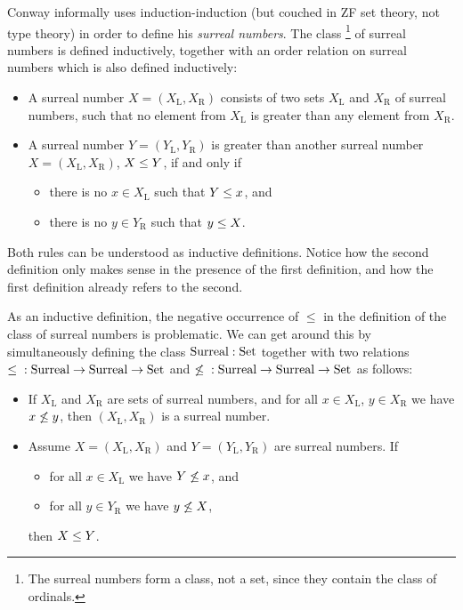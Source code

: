\documentclass{article}
\begin{document}
\begin{example}
\label{ex:surreal}

Conway \cite{conway2001ONAG} informally uses induction-induction (but
couched in ZF set theory, not type theory) in order to define his
\emph{surreal numbers}. The class \footnote{The surreal numbers form a
  class, not a set, since they contain the class of
  ordinals.} of surreal numbers is
defined inductively, together with an order relation on surreal
numbers which is also defined inductively:

\begin{itemize}
\item A surreal number $X = (X_\mathrm{L}, X_\mathrm{R})$ consists of
  two sets $X_\mathrm{L}$ and $X_\mathrm{R}$ of surreal numbers, such
  that no element from $X_\mathrm{L}$ is greater than any element from
  $X_\mathrm{R}$.
\item A surreal number $Y = (Y_\mathrm{L}, Y_\mathrm{R})$ is greater
  than another surreal number $X = (X_\mathrm{L}, X_\mathrm{R})$, $X \leq Y$, if and
  only if
  \begin{itemize}
  \item there is no $x \in X_\mathrm{L}$ such that $Y \leq x$, and
  \item there is no $y \in Y_\mathrm{R}$ such that $y \leq X$.
  \end{itemize}
\end{itemize}

Both rules can be understood as inductive definitions. Notice how the
second definition only makes sense in the presence of the first
definition, and how the first definition already refers to the second.

As an inductive definition, the negative occurrence of $\leq$ in the
definition of the class of surreal numbers is problematic. We can get
around this by simultaneously defining the class $\text{Surreal} : \text{Set}$
together with two relations ${ \leq {} : \text{Surreal} \to \text{Surreal} \to \text{Set}}$ and
${ \not\leq {} : \text{Surreal} \to \text{Surreal} \to \text{Set}}$ as follows:

\begin{itemize}
\item If $X_\mathrm{L}$ and $X_\mathrm{R}$ are sets of surreal
  numbers, and for all $x \in X_\mathrm{L}$, $y \in X_\mathrm{R}$ we
  have $x \not\leq y$, then $(X_\mathrm{L}, X_\mathrm{R})$ is a surreal number.

\item Assume $X = (X_\mathrm{L}, X_\mathrm{R})$ and $Y = (Y_\mathrm{L}, Y_\mathrm{R})$ are surreal numbers.
 If 
 \begin{itemize}
 \item for all $x \in X_\mathrm{L}$ we have $Y \not\leq x$, and
 \item for all $y \in Y_\mathrm{R}$ we have $y \not\leq X$,
 \end{itemize}
then $X \leq Y$.


\end{itemize}
\end{example}
\end{document}
